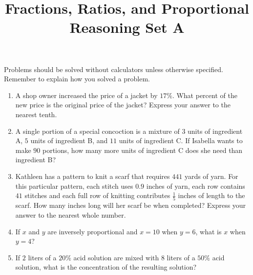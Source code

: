 \documentclass{article}
\title{Fractions, Ratios, and Proportional Reasoning Set A}
\author{}
\date{}
\begin{document}
    \maketitle
    \noindent Problems should be solved without calculators unless otherwise specified. Remember to explain how you solved a problem.
    \begin{enumerate}
        \item A shop owner increased the price of a jacket by $17\%$. What percent of the new price is the original price of the jacket? Express your answer to the nearest tenth.
        \vspace{3cm}
        \item A single portion of a special concoction is a mixture of $3$ units of ingredient A, $5$ units of ingredient B, and $11$ units of ingredient C. If Isabella wants to make $90$ portions, how many more units of ingredient C does she need than ingredient B?
        \vspace{3cm}
        \item Kathleen has a pattern to knit a scarf that requires $441$ yards of yarn. For this particular pattern, each stitch uses $0.9$ inches of yarn, each row contains $41$ stitches and each full row of knitting contributes $\frac{1}{5}$ inches of length to the scarf. How many inches long will her scarf be when completed? Express your answer to the nearest whole number.
        \vspace{3cm}
        \item If $x$ and $y$ are inversely proportional and $x = 10$ when $y = 6$, what is $x$ when $y = 4$?
        \vspace{3cm}
        \item If $2$ liters of a $20\%$ acid solution are mixed with $8$ liters of a $50\%$ acid solution, what is the concentration of the resulting solution?
        \vspace{3cm}
    \end{enumerate}
\end{document}
